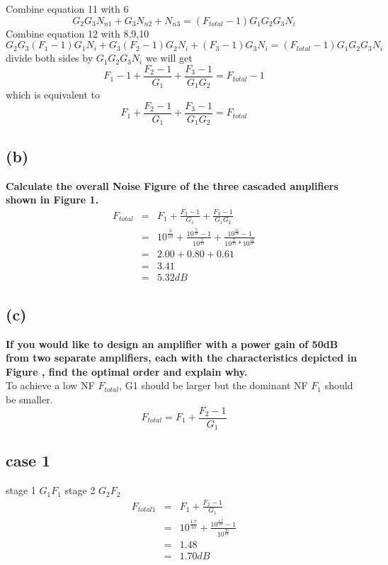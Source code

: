 \documentclass[12pt,a4paper]{article}
\begin{document}
Combine equation 11 with 6
\begin{equation}
G_2G_3N_{n1}+G_3N_{n2}+N_{n3}=(F_{total}-1)G_1G_2G_3N_i
\end{equation}
Combine equation 12 with 8,9,10
\begin{equation}
G_2G_3(F_1-1)G_1N_i+G_3(F_2-1)G_2N_i+(F_3-1)G_3N_i=(F_{total}-1)G_1G_2G_3N_i
\end{equation}
divide both sides by $G_1G_2G_3N_i$ we will get
\begin{equation}
F_1-1+\frac{F_2-1}{G_1}+\frac{F_3-1}{G_1G_2}=F_{total}-1
\end{equation}
which is equivalent to
\begin{equation}
F_1+\frac{F_2-1}{G_1}+\frac{F_3-1}{G_1G_2}=F_{total}
\end{equation}
\subsection*{(b)}
\textbf{Calculate the overall Noise Figure of the three cascaded amplifiers shown in Figure 1.}\\
\newline
\begin{eqnarray*}
F_{total}&=&F_1+\frac{F_2-1}{G_1}+\frac{F_3-1}{G_1G_2}\\
&=&10^{\frac{3}{10}}+\frac{10^{\frac{7}{10}}-1}{10^{\frac{7}{10}}}+\frac{10^{\frac{15}{10}}-1}{10^{\frac{7}{10}}*10^{\frac{10}{10}}}\\
&=&2.00+0.80+0.61\\
&=&3.41\\
&=&5.32 dB
\end{eqnarray*}
\subsection*{(c)}
\textbf{If you would like to design an amplifier with a power gain of 50dB from two separate amplifiers, each with the characteristics depicted in Figure , find the optimal order and explain why.}\\
\newline
To achieve a low NF $F_{total}$, G1 should be larger but the dominant NF $F_1$ should be smaller.
\begin{equation}
F_{total}=F_1+\frac{F_2-1}{G_1}
\end{equation}
\subsection*{case 1}
stage 1 $G_1 F_1$ stage 2 $G_2 F_2$
\begin{eqnarray*}
F_{total1}&=&F_1+\frac{F_2-1}{G_1}\\
&=&10^{\frac{1.7}{10}}+\frac{10^{\frac{1.3}{10}}-1}{10^{\frac{30}{10}}}\\
&=&1.48\\
&=&1.70 dB
\end{eqnarray*}
\end{document}

